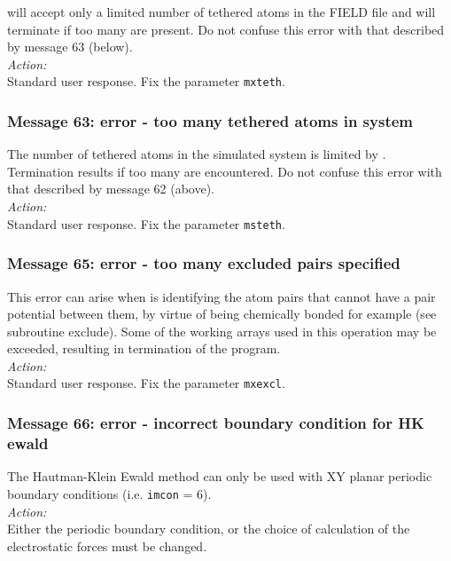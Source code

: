 \D{} will accept only a limited number of tethered atoms in the
FIELD file and will terminate if too many are present.
Do not confuse
this error with that described by message 63 (below). \\ 

\noindent
{\em Action:} \\ 
Standard user response. Fix the parameter {\tt mxteth}.

\subsubsection*{Message 63: error - too many
tethered  atoms in system}

The number of tethered atoms in the simulated system is limited by
\D{}. Termination results if too many are encountered.  Do
not confuse this error with that described by message 62 (above).
\\

\noindent
{\em Action:} \\ 
Standard user response. Fix the parameter {\tt msteth}.

\subsubsection*{Message 65: error - too many excluded pairs specified}

This error can arise when \D{} is identifying the atom pairs that
cannot have a pair potential between them, by virtue of being
chemically bonded for example (see subroutine {\sc exclude}). Some of
the working arrays used in this operation may be exceeded, resulting
in termination of the program. \\ 

\noindent
{\em Action:} \\ 
Standard user response. Fix the parameter {\tt mxexcl}.

\subsubsection*{Message 66: error - incorrect boundary condition for HK ewald}

The Hautman-Klein Ewald method can only be used with XY planar
periodic boundary conditions (i.e. {\tt imcon} = 6). \\

\noindent
{\em Action:} \\ 
Either the periodic
boundary condition, or the choice of calculation of the electrostatic
forces must be changed. \\

